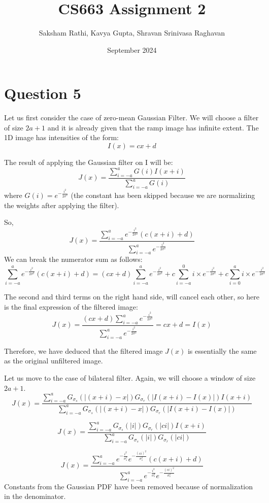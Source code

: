 \documentclass[12pt]{article}
\title{{\bf CS663 Assignment 2}}
\author{Saksham Rathi, Kavya Gupta, Shravan Srinivasa Raghavan}
\date{September 2024}
\begin{document}
\maketitle
\clearpage
\tableofcontents
\clearpage
\section*{Question 5}

Let us first consider the case of zero-mean Gaussian Filter. We will choose a filter of size $2a+1$ and it is already given that the ramp image has infinite extent. The 1D image has intensities of the form:
\[I(x) = cx + d\]

The result of applying the Gaussian filter on I will be:
\[J(x) = \frac{\sum_{i=-a}^{a}G(i)I(x+i)}{\sum_{i=-a}^{a}G(i)}\]
where $G(i) = e^{-\frac{i^2}{2\sigma^2}}$ (the constant has been skipped because we are normalizing the weights after applying the filter).

So,
\[J(x) = \frac{\sum_{i=-a}^{a}e^{-\frac{i^2}{2\sigma^2}}(c(x+i)+d)}{\sum_{i=-a}^{a}e^{-\frac{i^2}{2\sigma^2}}}\]We can break the numerator sum as follows:
\[\sum_{i=-a}^{a}e^{-\frac{i^2}{2\sigma^2}}(c(x+i)+d) = (cx+d)\sum_{i=-a}^{a}e^{-\frac{i^2}{2\sigma^2}} + c\sum_{i=-a}^{0}i\times e^{-\frac{i^2}{2\sigma^2}} + c\sum_{i=0}^{a}i\times e^{-\frac{i^2}{2\sigma^2}}\]

The second and third terms on the right hand side, will cancel each other, so here is the final expression of the filtered image:
\[J(x) = \frac{(cx+d)\sum_{i=-a}^{a}e^{-\frac{i^2}{2\sigma^2}}}{\sum_{i=-a}^{a}e^{-\frac{i^2}{2\sigma^2}}} = cx+d = I(x)\]


Therefore, we have deduced that the filtered image $J(x)$ is essentially the same as the original unfiltered image.


Let us move to the case of bilateral filter. Again, we will choose a window of size $2a+1$.
\[J(x) = \frac{\sum_{i=-a}^a G_{\sigma_s}(|(x+i)-x|)G_{\sigma_r}(|I(x+i)-I(x)|)I(x+i)}{\sum_{i=-a}^aG_{\sigma_s}(|(x+i)-x|)G_{\sigma_r}(|I(x+i)-I(x)|)}\]

\[J(x) = \frac{\sum_{i=-a}^a G_{\sigma_s}(|i|)G_{\sigma_r}(|ci|)I(x+i)}{\sum_{i=-a}^aG_{\sigma_s}(|i|)G_{\sigma_r}(|ci|)}\]

\[J(x) = \frac{\sum_{i=-a}^a e^{-\frac{i^2}{\sigma_s^2}} e^{-\frac{(ci)^2}{\sigma_s^2}}(c(x+i)+d)}{\sum_{i=-a}^a e^{-\frac{i^2}{\sigma_s^2}} e^{-\frac{(ci)^2}{\sigma_s^2}}}\]
Constants from the Gaussian PDF have been removed because of normalization in the denominator.
\end{document}
